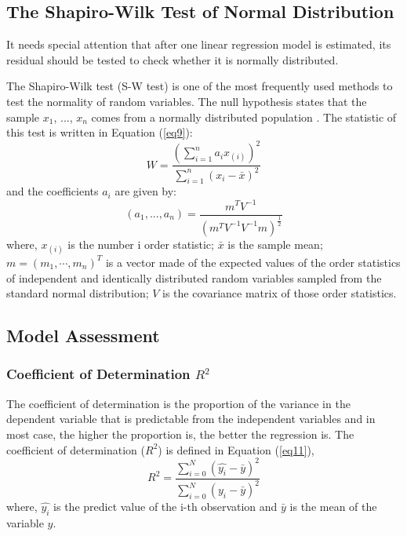 \documentclass[12pt, a4paper]{article}
\begin{document}
\begin{spacing}{1.5}
\subsection{The Shapiro-Wilk Test of Normal Distribution}
It needs special attention that after one linear regression model is estimated, its residual should be tested to check whether it is normally distributed.

The Shapiro-Wilk test (S-W test) is one of the most frequently used methods to test the normality of random variables. The null hypothesis states that the sample $x_1$, ..., $x_n$ comes from a normally distributed population \cite{SW}. The statistic of this test is written in Equation (\ref{eq9}):
\begin{equation}
	W=\frac{(\sum_{i=1}^na_ix_{(i)})^2}{\sum_{i=1}^n(x_i-\bar{x})^2}	
	\label{eq9}
\end{equation}
and the coefficients $a_i$ are given by:
\begin{equation}
	(a_1, ...,a_n)=\frac{m^{T}V^{-1}}{(m^TV^{-1}V^{-1}m)^{\frac{1}{2}}}	
	\label{eq10}
\end{equation}
where, $x_{(i)}$ is the number i order statistic;
$\bar{x}$ is the sample mean;
$m = (m_1, \cdots, m_n)^T$ is a vector made of the expected values of the order statistics of independent and identically distributed random variables sampled from the standard normal distribution;
$V$ is the covariance matrix of those order statistics.
\subsection{Model Assessment}
\subsubsection{Coefficient of Determination $R^2$}
The coefficient of determination is the proportion of the variance in the dependent variable that is predictable from the independent variables and in most case, the higher the proportion is, the better the regression is. The coefficient of determination ($R^2$) is defined in Equation (\ref{eq11}),
\begin{equation}
	R^2 = \frac{\sum_{i=0}^N(\hat{y_i}-\bar{y})^2}{\sum_{i=0}^N(y_i-\bar{y})^2}
	\label{eq11}
\end{equation}
where, $\hat{y_i}$ is the predict value of the i-th observation and $\bar{y}$ is the mean of the variable $y$.

\end{spacing}
\end{document}
